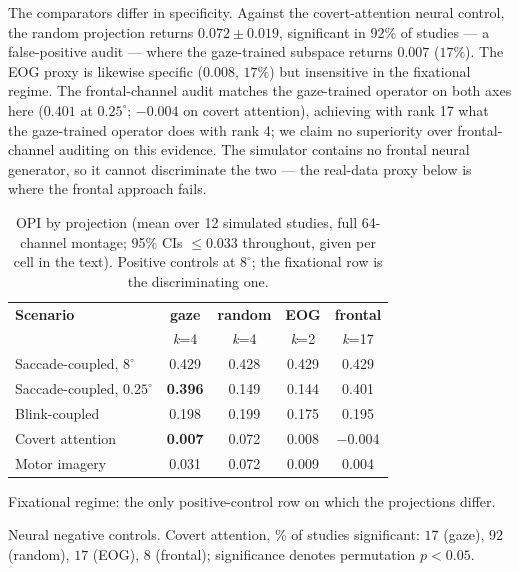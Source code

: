 \documentclass[conference]{IEEEtran}
\begin{document}
The comparators differ in specificity. Against the covert-attention neural control, the random
projection returns $0.072\pm0.019$, significant in $92\%$ of studies --- a false-positive audit ---
where the gaze-trained subspace returns $0.007$ ($17\%$). The EOG proxy
is likewise specific ($0.008$, $17\%$) but insensitive in the fixational regime. The
frontal-channel audit matches the gaze-trained operator on both axes here ($0.401$ at
$0.25^\circ$; $-0.004$ on covert attention), achieving with rank 17 what the gaze-trained operator does
with rank 4; we claim no superiority over frontal-channel auditing on this evidence. The
simulator contains no frontal neural generator, so it cannot discriminate the two --- the
real-data proxy below is where the frontal approach fails.

\begin{table}[!t]
\centering
\caption{OPI by projection (mean over 12 simulated studies, full 64-channel montage; 95\% CIs
$\le0.033$ throughout, given per cell in the text). Positive controls at $8^\circ$; the
fixational row is the discriminating one.}\label{tab:baselines}
\begin{threeparttable}
{\small
\begin{tabular*}{\columnwidth}{@{\extracolsep{\fill}} l cccc @{}}
\toprule
\textbf{Scenario} & \textbf{gaze} & \textbf{random} & \textbf{EOG} & \textbf{frontal} \\
 & \emph{k}=4 & \emph{k}=4 & \emph{k}=2 & \emph{k}=17 \\
\midrule
Saccade-coupled, $8^\circ$    & 0.429 & 0.428 & 0.429 & 0.429 \\
Saccade-coupled, $0.25^\circ$\tnote{a} & \textbf{0.396} & 0.149 & 0.144 & 0.401 \\
Blink-coupled                 & 0.198 & 0.199 & 0.175 & 0.195 \\
Covert attention\tnote{b}     & \textbf{0.007} & 0.072 & 0.008 & $-$0.004 \\
Motor imagery\tnote{b}        & 0.031 & 0.072 & 0.009 & 0.004 \\
\bottomrule
\end{tabular*}}
\begin{tablenotes}
\small
\item[a] Fixational regime: the only positive-control row on which the projections differ.
\item[b] Neural negative controls. Covert attention, \% of studies significant: $17$ (gaze),
$92$ (random), $17$ (EOG), $8$ (frontal); significance denotes permutation $p<0.05$.
\end{tablenotes}
\end{threeparttable}
\end{table}
\end{document}
